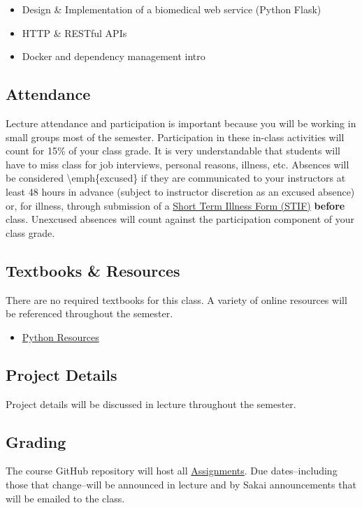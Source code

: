 \begin{itemize}
  \begin{itemize}
  \item
    Design \& Implementation of a biomedical web service (Python Flask)
  \item
    HTTP \& RESTful APIs
  \item
    Docker and dependency management intro
  \end{itemize}
\end{itemize}

\subsection*{Attendance}
Lecture attendance and participation is important because you will be working
in small groups most of the semester. Participation in these in-class
activities will count for 15\% of your class grade. It is very understandable
that students will have to miss class for job interviews, personal reasons,
illness, etc. Absences will be considered \textbackslash{}emph\{excused\} if
they are communicated to your instructors at least 48 hours in advance
(subject to instructor discretion as an excused absence) or, for illness,
through submission of a
\href{http://www.pratt.duke.edu/undergrad/policies/3531}{Short Term Illness
Form (STIF)} \textbf{before} class. Unexcused absences will count against the
participation component of your class grade.

\subsection*{Textbooks \& Resources}
There are no required textbooks for this class. A variety of online
resources will be referenced throughout the semester.

\begin{itemize}
\item
  \href{Resources/python.md}{Python Resources}
\end{itemize}

\subsection*{Project Details}
Project details will be discussed in lecture throughout the semester.

\subsection*{Grading}
The course GitHub repository will host all \href{Assignments/}{Assignments}.
Due dates--including those that change--will be announced in lecture and
by Sakai announcements that will be emailed to the class.


